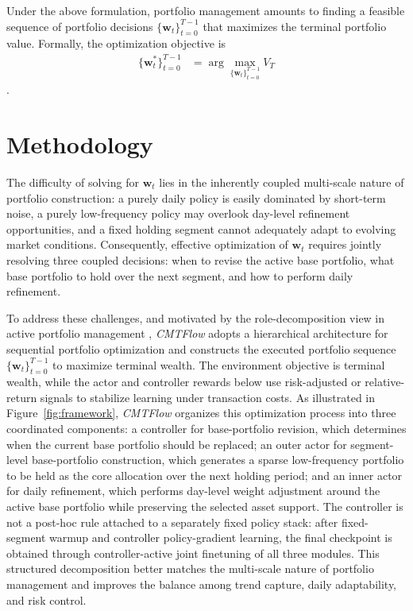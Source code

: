 \documentclass[letterpaper]{article} %
\begin{document}
Under the above formulation, portfolio management amounts to finding a feasible sequence of portfolio decisions $\{\mathbf{w}_t\}_{t=0}^{T-1}$ that maximizes the terminal portfolio value. Formally, the optimization objective is
\[
\begin{aligned}
\{\mathbf{w}_t^*\}_{t=0}^{T-1}
&= \arg\max_{\{\mathbf{w}_t\}_{t=0}^{T-1}} V_T
\end{aligned}
\].

\section{Methodology}
The difficulty of solving for \(\mathbf{w}_t\) lies in the inherently coupled multi-scale nature of portfolio construction: a purely daily policy is easily dominated by short-term noise, a purely low-frequency policy may overlook day-level refinement opportunities, and a fixed holding segment cannot adequately adapt to evolving market conditions. Consequently, effective optimization of \(\mathbf{w}_t\) requires jointly resolving three coupled decisions: when to revise the active base portfolio, what base portfolio to hold over the next segment, and how to perform daily refinement.

To address these challenges, and motivated by the role-decomposition view in active portfolio management \citep{kahn1999active}, \textit{CMTFlow} adopts a hierarchical architecture for sequential portfolio optimization and constructs the executed portfolio sequence \(\{\mathbf{w}_t\}_{t=0}^{T-1}\) to maximize terminal wealth. The environment objective is terminal wealth, while the actor and controller rewards below use risk-adjusted or relative-return signals to stabilize learning under transaction costs. As illustrated in Figure~\ref{fig:framework}, \textit{CMTFlow} organizes this optimization process into three coordinated components: a controller for base-portfolio revision, which determines when the current base portfolio should be replaced; an outer actor for segment-level base-portfolio construction, which generates a sparse low-frequency portfolio to be held as the core allocation over the next holding period; and an inner actor for daily refinement, which performs day-level weight adjustment around the active base portfolio while preserving the selected asset support. The controller is not a post-hoc rule attached to a separately fixed policy stack: after fixed-segment warmup and controller policy-gradient learning, the final checkpoint is obtained through controller-active joint finetuning of all three modules. This structured decomposition better matches the multi-scale nature of portfolio management and improves the balance among trend capture, daily adaptability, and risk control.
\end{document}
